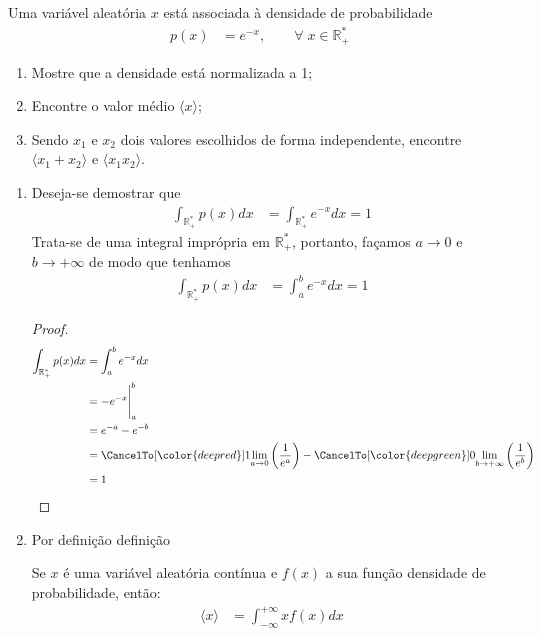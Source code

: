 \begin{prob}
	Uma variável aleatória $x$ está associada à densidade de probabilidade
	\begin{align}
		p(x) & =e^{-x},\qquad  \forall\; x\in \mathbb{R^\ast _+}\nonumber
	\end{align}
	\begin{enumerate}[label=\alph *)]
		\item Mostre que a densidade está normalizada a 1;
		\item Encontre o valor médio $\langle x\rangle$;
		\item Sendo $x_1$ e $x_2$ dois valores escolhidos de forma independente, encontre $\langle x_1+x_2\rangle$ e $\langle x_1x_2\rangle$.
	\end{enumerate}

	\begin{sol}
		\begin{enumerate}[label=\alph *)]
			\item Deseja-se demostrar que
			\begin{align}
				\int_{\mathbb{R^*_+}}p(x)dx & =\int_{\mathbb{R^*_+}}e^{-x}dx=1
			\end{align}
			\noindent Trata-se de uma integral imprópria em $\mathbb{R^*_+}$, portanto, façamos $a\to 0$ e $b\to +\infty$ de modo que tenhamos
			\begin{align}
				\int_{\mathbb{R^*_+}}p(x)dx & =\int_{a}^{b}e^{-x}dx=1
			\end{align}
			\begin{proof}
				\begin{align}
					\label{dem:a}
					\int_{\mathbb{R^*_+}}p(x)dx&=\int_{a}^{b}e^{-x}dx\nonumber \\
				    & =-e^{-x}\Biggr |_a^b\nonumber \\
				    &=e^{-a}-e^{-b}\nonumber \\
				    & =\CancelTo[\color{deepred}]{1}{\lim_{a\to 0}\left(\frac{1}{e^a}\right)}-\CancelTo[\color{deepgreen}]{0}{\lim_{b\to +\infty}\left(\frac{1}{e^b}\right)}\nonumber \\
				    & =1
				\end{align}
			\end{proof}
				\item Por definição definição
				\begin{definition}
					Se $x$ é uma variável aleatória contínua e $f(x)$ a sua função densidade de probabilidade, então:
					\begin{align}
						\label{def:valor-esperado-fdp}
						\langle x\rangle & =\int_{-\infty}^{+\infty}xf(x)dx

\end{align}
\end{definition}
\end{enumerate}
\end{sol}
\end{prob}
